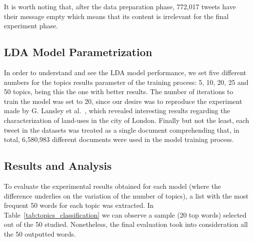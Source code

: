 It is worth noting that, after the data preparation phase, 772,017 tweets have their message empty which means that its content is irrelevant for the final experiment phase.

\subsection{LDA Model Parametrization}
In order to understand and see the LDA model performance, we set five different numbers for the topics results parameter of the training process: 5, 10, 20, 25 and 50 topics, being this the one with better results. The number of iterations to train the model was set to 20, since our desire was to reproduce the experiment made by G. Lansley et al.~\cite{lansley2016geography}, which revealed interesting results regarding the characterization of land-uses in the city of London. Finally but not the least, each tweet in the datasets was treated as a single document comprehending that, in total, 6,580,983 different documents were used in the model training process.
	
\subsection{Results and Analysis}
\label{subsec:topic_modelling_results}
\label{subsec:lda_results}
To evaluate the experimental results obtained for each model (where the difference underlies on the variation of the number of topics), a list with the most frequent 50 words for each topic was extracted. In Table~\ref{tab:topics_classification} we can observe a sample (20 top words) selected out of the 50 studied. Nonetheless, the final evaluation took into consideration all the  50 outputted words.

